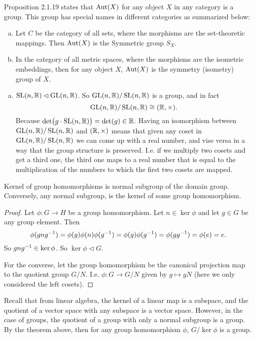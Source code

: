 \begin{observation}
	Proposition 2.1.19 states that $ \operatorname{Aut}(X) $ for any object $ X $ in any category is a group. This group has special names in different categories as summarized below:
	\begin{enumerate}[(a)]
		\item Let $ C $ be the category of all sets, where the morphisms are the set-theoretic mappings. Then $ \operatorname{Aut}(X) $ is the Symmetric group $ S_X $.
		\item In the category of all metric spaces, where the morphisms are the isometric embeddings, then for any object $ X $, $ \operatorname{Aut}(X) $ is the symmetry (isometry) group of $ X $.
	\end{enumerate}
\end{observation}


\begin{summary}
	\begin{enumerate}[(a)]
		\item $ \operatorname{SL}(n,\mathbb{R}) \lhd \operatorname{GL}(n,\mathbb{R}) $. So $ \operatorname{GL}(n,\mathbb{R})/\operatorname{SL}(n,\mathbb{R}) $ is a group, and in fact
		\[ \operatorname{GL}(n,\mathbb{R})/\operatorname{SL}(n,\mathbb{R}) \cong (\mathbb{R},\times). \]
		Because $ \det(g\cdot \operatorname{SL}(n,\mathbb{R})) = \det(g) \in \mathbb{R} $. Having an isomorphism between $ \operatorname{GL}(n,\mathbb{R})/\operatorname{SL}(n,\mathbb{R}) $ and $ (\mathbb{R},\times) $ means that given any coset in $ \operatorname{GL}(n,\mathbb{R})/\operatorname{SL}(n,\mathbb{R}) $ we can come up with a real number, and vise versa in a way that the group structure is preserved. I.e. if we multiply two cosets and get a third one, the third one maps to a real number that is equal to the multiplication of the numbers to which the first two cosets are mapped.
	\end{enumerate}
\end{summary}


\begin{theorem}
	Kernel of group homomorphisms is normal subgroup of the domain group. Conversely, any normal subgroup, is the kernel of some group homomorphism.
\end{theorem}
\begin{proof}
	Let $ \phi: G\to H $ be a group homomorphism. Let $ n \in \ker \phi $ and let $ g\in G $ be any group element. Then
	\[ \phi(gng^{-1}) = \phi(g) \phi(n) \phi(g^{-1}) = \phi(g) \phi(g^{-1}) = \phi(gg^{-1}) = \phi(e) = e. \]
	So $ gng^{-1} \in \ker \phi $. So $ \ker \phi \lhd G $.
	
	For the converse, let the group homomorphism be the canonical projection map to the quotient group $ G/N $. I.e. $ \phi: G\to G/N $ given by $ g \mapsto gN $ (here we only considered the left cosets).
\end{proof}
\begin{remark}
	Recall that from linear algebra, the kernel of a linear map is a subspace, and the quotient of a vector space with any subspace is a vector space. However, in the case of groups, the quotient of a group with only a normal subgroup is a group. By the theorem above, then for any group homomorphism $ \phi $, $ G/\ker \phi $ is a group.
\end{remark}


